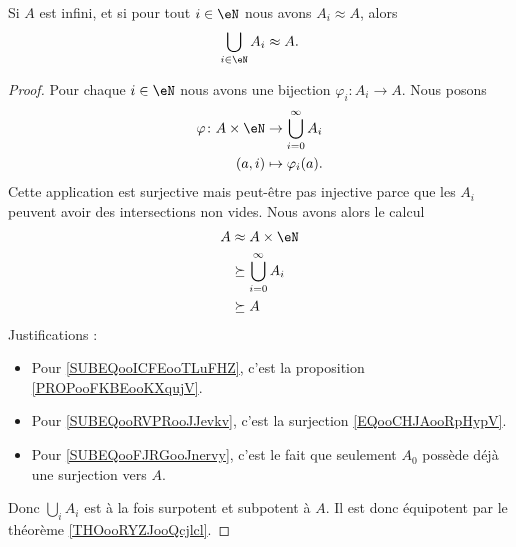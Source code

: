 \begin{lemma}       \label{LEMooNKKDooUvSYPO}
    Si \( A\) est infini, et si pour tout \( i\in \eN\) nous avons \( A_i\approx A\), alors
    \begin{equation}
        \bigcup_{i\in \eN}A_i\approx A.
    \end{equation}
\end{lemma}

\begin{proof}
    Pour chaque \( i\in \eN\) nous avons une bijection \( \varphi_i\colon A_i\to A\). Nous posons
    \begin{equation}        \label{EQooCHJAooRpHypV}
        \begin{aligned}
            \varphi\colon A\times \eN&\to \bigcup_{i=0}^{\infty}A_i \\
            (a,i)&\mapsto \varphi_i(a). 
        \end{aligned}
    \end{equation}
    Cette application est surjective mais peut-être pas injective parce que les \( A_i\) peuvent avoir des intersections non vides. Nous avons alors le calcul
    \begin{subequations}
        \begin{align}
            A&\approx A\times \eN        \label{SUBEQooICFEooTLuFHZ}\\
            &\succeq \bigcup_{i=0}^{\infty}A_i      \label{SUBEQooRVPRooJJevkv}\\
            &\succeq A      \label{SUBEQooFJRGooJnervy}
        \end{align}
    \end{subequations}
    Justifications :
    \begin{itemize}
        \item Pour \eqref{SUBEQooICFEooTLuFHZ}, c'est la proposition \ref{PROPooFKBEooKXqujV}.
        \item Pour \eqref{SUBEQooRVPRooJJevkv}, c'est la surjection \eqref{EQooCHJAooRpHypV}.
        \item Pour \eqref{SUBEQooFJRGooJnervy}, c'est le fait que seulement \( A_0\) possède déjà une surjection vers \( A\).
    \end{itemize}
    Donc \( \bigcup_iA_i\) est à la fois surpotent et subpotent à \( A\). Il est donc équipotent par le théorème \ref{THOooRYZJooQcjlcl}.
\end{proof}

